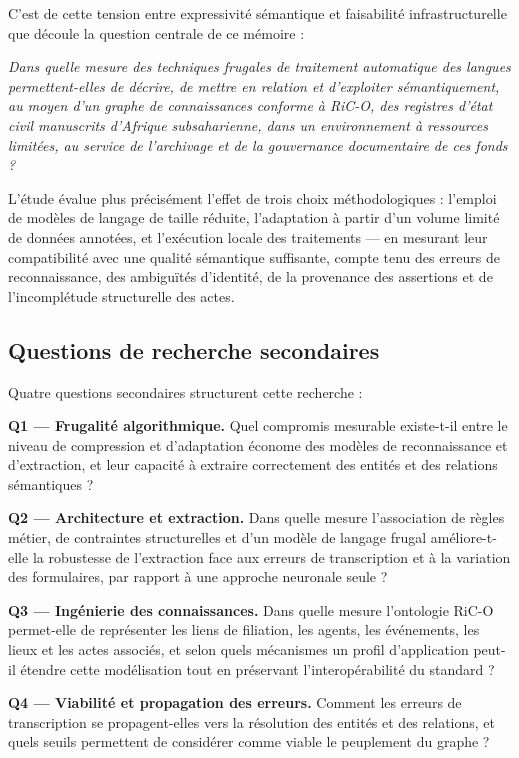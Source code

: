 C'est de cette tension entre expressivité sémantique et faisabilité infrastructurelle que découle la question centrale de ce mémoire :

\emph{Dans quelle mesure des techniques frugales de traitement automatique des langues permettent-elles de décrire, de mettre en relation et d'exploiter sémantiquement, au moyen d'un graphe de connaissances conforme à RiC-O, des registres d'état civil manuscrits d'Afrique subsaharienne, dans un environnement à ressources limitées, au service de l'archivage et de la gouvernance documentaire de ces fonds ?}

L'étude évalue plus précisément l'effet de trois choix méthodologiques : l'emploi de modèles de langage de taille réduite, l'adaptation à partir d'un volume limité de données annotées, et l'exécution locale des traitements --- en mesurant leur compatibilité avec une qualité sémantique suffisante, compte tenu des erreurs de reconnaissance, des ambiguïtés d'identité, de la provenance des assertions et de l'incomplétude structurelle des actes.

\subsection*{Questions de recherche secondaires}

Quatre questions secondaires structurent cette recherche :

\textbf{Q1 --- Frugalité algorithmique.} Quel compromis mesurable existe-t-il entre le niveau de compression et d'adaptation économe des modèles de reconnaissance et d'extraction, et leur capacité à extraire correctement des entités et des relations sémantiques ?

\textbf{Q2 --- Architecture et extraction.} Dans quelle mesure l'association de règles métier, de contraintes structurelles et d'un modèle de langage frugal améliore-t-elle la robustesse de l'extraction face aux erreurs de transcription et à la variation des formulaires, par rapport à une approche neuronale seule ?

\textbf{Q3 --- Ingénierie des connaissances.} Dans quelle mesure l'ontologie RiC-O permet-elle de représenter les liens de filiation, les agents, les événements, les lieux et les actes associés, et selon quels mécanismes un profil d'application peut-il étendre cette modélisation tout en préservant l'interopérabilité du standard ?

\textbf{Q4 --- Viabilité et propagation des erreurs.} Comment les erreurs de transcription se propagent-elles vers la résolution des entités et des relations, et quels seuils permettent de considérer comme viable le peuplement du graphe ?

